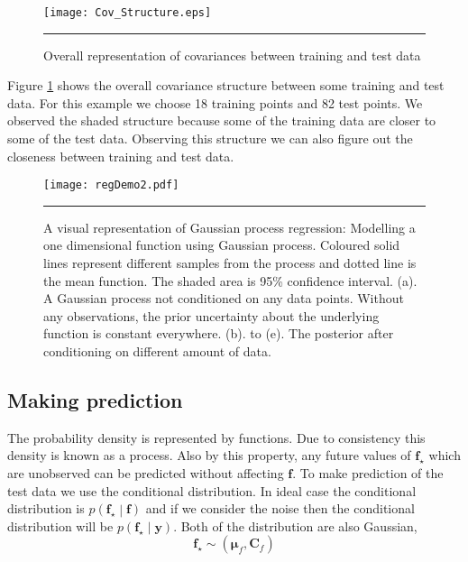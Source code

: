 \begin{figure}[t]
	\centering
		\texttt{[image: Cov\_Structure.eps]}
		\rule{35em}{0.5pt}
	\caption[Overall representation of covariances between training and test data]
		{Overall representation of covariances between training and test data}
	\label{fig:Covariances_Structure}
\end{figure}

Figure \ref{fig:Covariances_Structure} shows the overall covariance structure between some training and test data. For this example we choose 18 training points and 82 test points. We observed the shaded structure because some of the training data are closer to some of the test data. Observing this structure we can also figure out the closeness between training and test data. 

\begin{figure}
	\centering
		\texttt{[image: regDemo2.pdf]}
		\rule{35em}{0.5pt}
	\caption[A visual representation of Gaussian process regression: Modelling a one dimensional function using Gaussian process]
		{A visual representation of Gaussian process regression: Modelling a one dimensional function using Gaussian process. Coloured solid lines represent different samples from the process and dotted line is the mean function. The shaded area is 95\% confidence interval. (a). A Gaussian process not conditioned on any data points. Without any observations, the prior uncertainty about the underlying function is constant everywhere. (b). to (e). The posterior after conditioning on different amount of data.}
	\label{fig:dempGPReg}
\end{figure}

\subsection{Making prediction}
The probability density is represented by functions. Due to consistency this density is known as a process. Also by this property, any future values of $\mathbf{f_\star}$ which are unobserved can be predicted without affecting $\mathbf{f}$. To make prediction of the test data we use the conditional distribution. In ideal case the conditional distribution is $ p\left( \mathbf{f_\star} \middle| \mathbf{f} \right) $ and if we consider the noise then the conditional distribution will be $ p\left( \mathbf{f_\star} \middle| \mathbf{y} \right) $. Both of the distribution are also Gaussian,
\begin{equation} \label{eq:prediction}
  \mathbf{f_\star}  \sim \left( \boldsymbol{\mu}_f, \mathbf{C}_f \right)
\end{equation}

